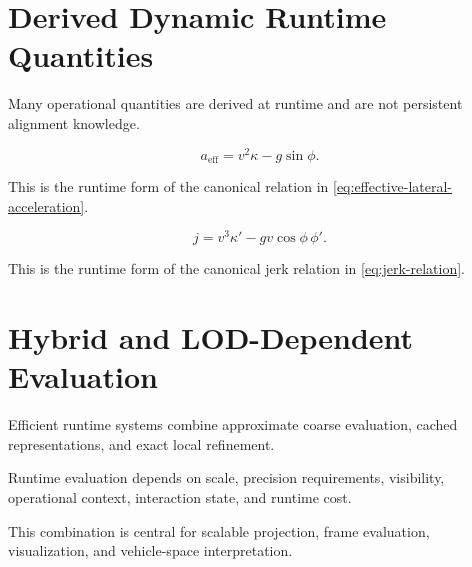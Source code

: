 \section{Derived Dynamic Runtime Quantities}

Many operational quantities are derived at runtime and are not
persistent alignment knowledge.

\begin{definition}
\label{eq:runtime-effective-acceleration}
\[
a_{\mathrm{eff}}
=
v^2\kappa-g\sin\phi.
\]
\end{definition}

This is the runtime form of the canonical relation in
\cref{eq:effective-lateral-acceleration}.

\begin{definition}
\label{eq:runtime-jerk}
\[
j
=
v^3\kappa'
-
gv\cos\phi\,\phi'.
\]
\end{definition}

This is the runtime form of the canonical jerk relation in
\cref{eq:jerk-relation}.

\section{Hybrid and LOD-Dependent Evaluation}

\begin{principle}
\label{princ:hybrid-runtime}
Efficient runtime systems combine approximate coarse evaluation, cached
representations, and exact local refinement.
\end{principle}

\begin{definition}
\label{def:lod-evaluation}
Runtime evaluation depends on scale, precision requirements, visibility,
operational context, interaction state, and runtime cost.
\end{definition}

This combination is central for scalable projection, frame evaluation,
visualization, and vehicle-space interpretation.

